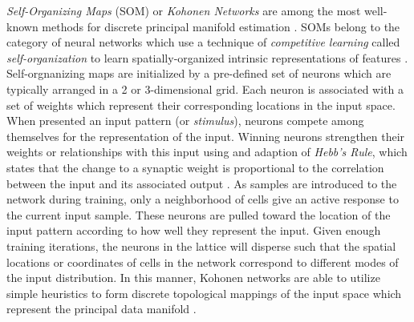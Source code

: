 \textit{Self-Organizing Maps} (SOM) or \textit{Kohonen Networks} \citep{Kohonen1990SOM} are among the most well-known methods for discrete principal manifold estimation \citep{Yin2007SOM,Sorzano2014DRReview}.   SOMs belong to the category of neural networks which use a technique of  \textit{competitive learning} called \textit{self-organization} to learn spatially-organized intrinsic representations of features \citep{Rauber2002GHSOM}.  Self-orgnanizing maps are initialized by a pre-defined set of neurons which are typically arranged in a 2 or 3-dimensional grid.  Each neuron is associated with a set of weights which represent their corresponding locations in the input space.   When presented an input pattern (or \textit{stimulus}), neurons compete among themselves for the representation of the input. Winning neurons strengthen their weights or relationships with this input using and adaption of \textit{Hebb's Rule}, which states that the change to a synaptic weight is proportional to the correlation between the input and its associated output \citep{Rumelhart1985CHL}.  As samples are introduced to the network during training, only a neighborhood of cells give an active response to the current input sample. These neurons are pulled toward the location of the input pattern according to how well they represent the input.  Given enough training iterations, the neurons in the lattice will disperse such that the spatial locations or coordinates of cells in the network correspond to different modes of the input distribution.  In this manner, Kohonen networks are able to utilize simple heuristics to form discrete topological mappings of the input space which represent the principal data manifold \citep{Yin2007SOM}. 

